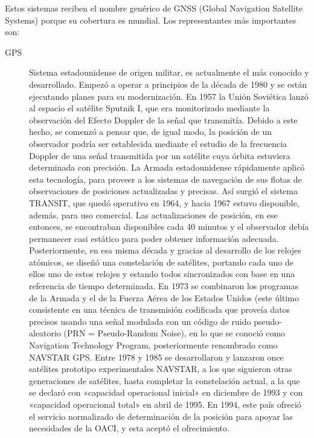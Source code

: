 Estos sistemas reciben el nombre gen\'erico de GNSS (Global Navigation Satellite Systems) porque su cobertura es mundial. Los representantes m\'as importantes son:

\begin{description}
\item [GPS] Sistema estadounidense de origen militar, es actualmente el m\'as conocido y desarrollado. Empez\'o a operar a principios de la d\'ecada de 1980 y se est\'an ejecutando planes para su modernizaci\'on.%
 En 1957 la Uni\'on Sovi\'etica lanz\'o al espacio el sat\'elite Sputnik I, que era monitorizado mediante la observaci\'on del Efecto Doppler de la se\~nal que transmit\'ia. Debido a este hecho, se comenz\'o a pensar que, de igual modo, la posici\'on de un observador podr\'ia ser establecida mediante el estudio de la frecuencia Doppler de una se\~nal transmitida por un sat\'elite cuya \'orbita estuviera determinada con precisi\'on.
La Armada estadounidense r\'apidamente aplic\'o esta tecnolog\'ia, para proveer a los sistemas de navegaci\'on de sus flotas de observaciones de posiciones actualizadas y precisas. As\'i surgi\'o el sistema TRANSIT, que qued\'o operativo en 1964, y hacia 1967 estuvo disponible, adem\'as, para uso comercial.
Las actualizaciones de posici\'on, en ese entonces, se encontraban disponibles cada 40 minutos y el observador deb\'ia permanecer casi est\'atico para poder obtener informaci\'on adecuada.
Posteriormente, en esa misma d\'ecada y gracias al desarrollo de los relojes at\'omicos, se dise\~n\'o una constelaci\'on de sat\'elites, portando cada uno de ellos uno de estos relojes y estando todos sincronizados con base en una referencia de tiempo determinada.
En 1973 se combinaron los programas de la Armada y el de la Fuerza A\'erea de los Estados Unidos (este \'ultimo consistente en una t\'ecnica de transmisi\'on codificada que prove\'ia datos precisos usando una se\~nal modulada con un c\'odigo de ruido pseudo-aleatorio (PRN = Pseudo-Random Noise), en lo que se conoci\'o como Navigation Technology Program, posteriormente renombrado como NAVSTAR GPS.
Entre 1978 y 1985 se desarrollaron y lanzaron once sat\'elites prototipo experimentales NAVSTAR, a los que siguieron otras generaciones de sat\'elites, hasta completar la constelaci\'on actual, a la que se declar\'o con «capacidad operacional inicial» en diciembre de 1993 y con «capacidad operacional total» en abril de 1995.
En 1994, este pa\'is ofreci\'o el servicio normalizado de determinaci\'on de la posici\'on para apoyar las necesidades de la OACI, y esta acept\'o el ofrecimiento.


\end{description}
